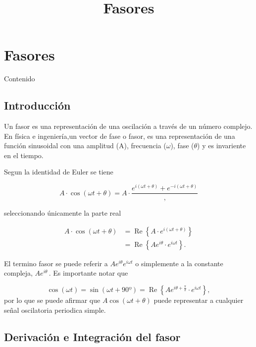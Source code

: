 \documentclass{article}
\title{Fasores}
\begin{document}
    
    
    \maketitle
    
    

    

    \section{Fasores}


    Contenido


    \subsection{Introducción}


    Un fasor es una representación de una oscilación a través de un número
complejo. En física e ingeniería,un vector de fase o fasor, es una
representación de una función sinusoidal con una amplitud (A),
frecuencia ($\omega$), fase ($\theta$) y es invariente en el tiempo.

Segun la identidad de Euler se tiene

\begin{equation}
A\cdot \cos(\omega t + \theta) = A \cdot \frac{e^{i(\omega t + \theta)} + e^{-i(\omega t + \theta)}},
\end{equation}

seleccionando únicamente la parte real

\begin{align}
A\cdot \cos(\omega t + \theta) &= \operatorname{Re} \left\{ A\cdot e^{i(\omega t + \theta)}\right\} \\
&= \operatorname{Re} \left\{ A e^{i\theta} \cdot e^{i\omega t}\right\}.
\end{align}

El termino fasor se puede referir a $Ae^{i\theta}e^{i \omega t} $ o
simplemente a la constante compleja, $A e^{i\theta}\, $. Es importante
notar que

\[
\cos(\omega t)= \sin (\omega t + 90º)=\operatorname{Re} \left\{ A e^{i\theta+\frac{\pi}{2}} \cdot e^{i\omega t}\right\},
\] por lo que se puede afirmar que $A\cos(\omega t+ \theta)$ puede
representar a cualquier señal oscilatoria periodica simple.


    \subsection{Derivación e Integración del fasor}
\end{document}

